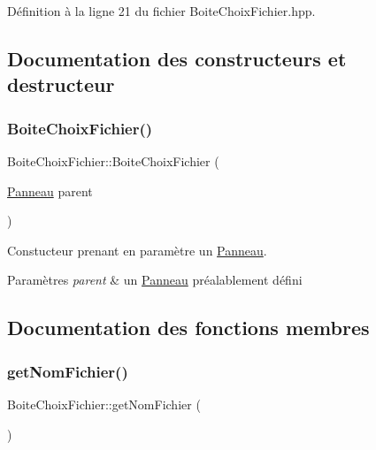 Définition à la ligne 21 du fichier Boite\+Choix\+Fichier.\+hpp.



\subsection{Documentation des constructeurs et destructeur}
\mbox{\label{class_boite_choix_fichier_a083c181fc64db190094be5bc3803e52b}} 
\subsubsection{\texorpdfstring{Boite\+Choix\+Fichier()}{BoiteChoixFichier()}}
{\footnotesize\ttfamily Boite\+Choix\+Fichier\+::\+Boite\+Choix\+Fichier (\begin{DoxyParamCaption}\item[{\hyperlink{class_panneau}{Panneau}}]{parent }\end{DoxyParamCaption})}



Constucteur prenant en paramètre un \hyperlink{class_panneau}{Panneau}. 


\begin{DoxyParams}{Paramètres}
{\em parent} & un \hyperlink{class_panneau}{Panneau} préalablement défini \\
\hline
\end{DoxyParams}


\subsection{Documentation des fonctions membres}
\mbox{\label{class_boite_choix_fichier_a0e051fe462c74d12ecea8a1c3bd7fad5}} 
\subsubsection{\texorpdfstring{get\+Nom\+Fichier()}{getNomFichier()}}
{\footnotesize\ttfamily Boite\+Choix\+Fichier\+::get\+Nom\+Fichier (\begin{DoxyParamCaption}{ }\end{DoxyParamCaption})}



